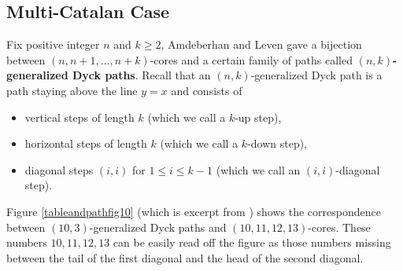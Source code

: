 \documentclass[a4paper,12pt]{article}
\begin{document}


\subsection{Multi-Catalan Case}


Fix positive  integer $n$ and $k \geq 2$, Amdeberhan and Leven \cite{eleven} gave a bijection between $(n,n+1,\ldots,n+k)$-cores and a certain family of paths called \textbf{$(n,k)$-generalized Dyck paths}.
Recall that an $(n,k)$-generalized Dyck path is a path staying above the line $y=x$ and consists of
\begin{itemize}
  \item vertical steps of length $k$ (which we call a $k$-up step),
  \item horizontal steps of length $k$ (which we call a $k$-down step),
  \item diagonal steps $(i,i)$ for $1\leq i \leq k-1$ (which we call an $(i,i)$-diagonal step).
\end{itemize}


Figure \ref{tableandpathfig10}  (which is excerpt from \cite{eleven}) shows the correspondence between  $(10,3)$-generalized Dyck paths and $(10,11,12,13)$-cores. These numbers $10,11,12,13$ can be easily read off the figure as those numbers missing between the tail of the first diagonal and the head of the second  diagonal.
\end{document}
